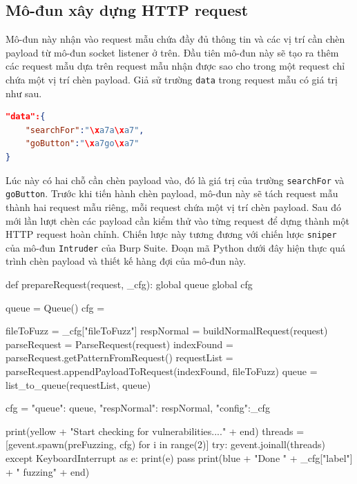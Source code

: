 \subsection{Mô-đun xây dựng HTTP request}
Mô-đun này nhận vào request mẫu chứa đầy đủ thông tin và các vị trí cần chèn payload từ mô-đun socket listener ở trên. Đầu tiên mô-đun này sẽ tạo ra thêm các request mẫu dựa trên request mẫu nhận được sao cho trong một request chỉ chứa một vị trí chèn payload. Giả sử trường \texttt{data} trong request mẫu có giá trị như sau.\\
\begin{lstlisting}[language=json,firstnumber=1]
"data":{ 
    "searchFor":"\xa7a\xa7",
    "goButton":"\xa7go\xa7"
}
\end{lstlisting}
Lúc này có hai chỗ cần chèn payload vào, đó là giá trị của trường \texttt{searchFor} và \texttt{goButton}. Trước khi tiến hành chèn payload, mô-đun này sẽ tách request mẫu thành hai request mẫu riêng, mỗi request chứa một vị trí chèn payload. Sau đó mới lần lượt chèn các payload cần kiểm thử vào từng request để dựng thành một HTTP request hoàn chỉnh. Chiến lược này tương đương với chiến lược \texttt{sniper} của mô-đun \texttt{Intruder} của Burp Suite. Đoạn mã Python dưới đây hiện thực quá trình chèn payload và thiết kế hàng đợi của mô-đun này.\\
\begin{python}
def prepareRequest(request, _cfg):
    global queue
    global cfg

    queue = Queue()
    cfg = {}

    fileToFuzz = _cfg["fileToFuzz"]
    respNormal = buildNormalRequest(request)
    parseRequest = ParseRequest(request)
    indexFound = parseRequest.getPatternFromRequest()
    requestList = parseRequest.appendPayloadToRequest(indexFound, fileToFuzz)
    queue = list_to_queue(requestList, queue)

    cfg = {"queue": queue, "respNormal": respNormal, "config":_cfg}

    print(yellow + "Start checking for vulnerabilities...." + end)
    threads = [gevent.spawn(preFuzzing, cfg) for i in range(2)] 
    try:
        gevent.joinall(threads)
    except KeyboardInterrupt as e:
        print(e)
        pass
    print(blue + "Done " + _cfg["label"] + " fuzzing" + end)
\end{python}
